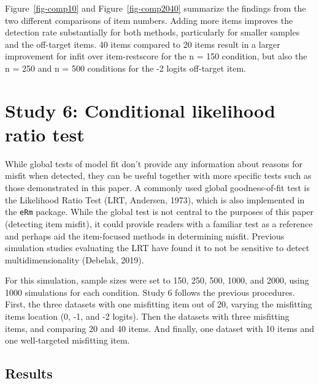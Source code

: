 \documentclass[
  letterpaper,
  DIV=11,
  numbers=noendperiod]{scrartcl}
\begin{document}
Figure~\ref{fig-comp10} and Figure~\ref{fig-comp2040} summarize the
findings from the two different comparisons of item numbers. Adding more
items improves the detection rate substantially for both methods,
particularly for smaller samples and the off-target items. 40 items
compared to 20 items result in a larger improvement for infit over
item-restscore for the n = 150 condition, but also the n = 250 and n =
500 conditions for the -2 logits off-target item.

\section{Study 6: Conditional likelihood ratio
test}\label{study-6-conditional-likelihood-ratio-test}

While global tests of model fit don't provide any information about
reasons for misfit when detected, they can be useful together with more
specific tests such as those demonstrated in this paper. A commonly used
global goodness-of-fit test is the Likelihood Ratio Test (LRT, Andersen,
1973), which is also implemented in the \texttt{eRm} package. While the
global test is not central to the purposes of this paper (detecting item
misfit), it could provide readers with a familiar test as a reference
and perhaps aid the item-focused methods in determining misfit. Previous
simulation studies evaluating the LRT have found it to not be sensitive
to detect multidimensionality (Debelak, 2019).

For this simulation, sample sizes were set to 150, 250, 500, 1000, and
2000, using 1000 simulations for each condition. Study 6 follows the
previous procedures. First, the three datasets with one misfitting item
out of 20, varying the misfitting items location (0, -1, and -2 logits).
Then the datasets with three misfitting items, and comparing 20 and 40
items. And finally, one dataset with 10 items and one well-targeted
misfitting item.

\subsection{Results}\label{results-4}
\end{document}
